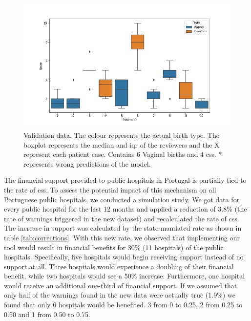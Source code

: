 \begin{figure}[htbp]
\centering
\captionsetup{justification=centering}
\caption{Validation data. The colour represents the actual birth type. The boxplot represents the median and \ac{iqr} of the reviewers and the X represent each patient case. Contains 6 Vaginal births and 4 \acp{cs}. * represents wrong predictions of the model.}\label{fig:clinical} 
\includegraphics[scale=0.50]{figures/clinical_assessment.png}
\end{figure}




The financial support provided to public hospitals in Portugal is partially tied to the rate of \acp{cs}. To assess the potential impact of this mechanism on all Portuguese public hospitals, we conducted a simulation study. We got data for every public hospital for the last 12 months \cite{pordatacesarianas} and applied a reduction of 3.8\% (the rate of warnings triggered in the new dataset) and recalculated the rate of \acp{cs}. The increase in support was calculated by the state-mandated rate as shown in table \ref{tab:corrections}. With this new rate, we observed that implementing our tool would result in financial benefits for 30\% (11 hospitals) of the public hospitals. Specifically, five hospitals would begin receiving support instead of no support at all. Three hospitals would experience a doubling of their financial benefit, while two hospitals would see a 50\% increase. Furthermore, one hospital would receive an additional one-third of financial support.
If we assumed that only half of the warnings found in the new data were actually true (1.9\%) we found that only 6 hospitals would be benefited. 3 from 0 to 0.25, 2 from 0.25 to 0.50 and 1 from 0.50 to 0.75.


